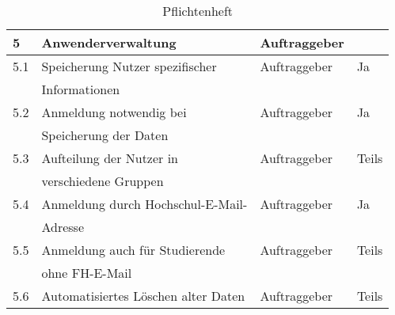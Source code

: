 \begin{table}[H]
\begin{center}
\begin{tabular}{| l | l | l | l |}
\hline    
\rowcolor{LGray} 						
5		& Anwenderverwaltung								& Auftraggeber &\\
\hline
5.1		& Speicherung Nutzer spezifischer 					& Auftraggeber & Ja\\
		& Informationen										&			   &\\
\hline
5.2		& Anmeldung notwendig bei 						 	& Auftraggeber & Ja\\
		& Speicherung der Daten								&			   &\\
\hline
5.3		& Aufteilung der Nutzer in 							& Auftraggeber &Teils\\
		& verschiedene Gruppen								&			   &\\
\hline
5.4		& Anmeldung durch Hochschul-E-Mail-					& Auftraggeber & Ja\\
		& Adresse											&			   &\\
\hline
5.5		& Anmeldung auch für Studierende 					& Auftraggeber & Teils\\
		& ohne FH-E-Mail									& 			   &\\
\hline
5.6		& Automatisiertes Löschen alter Daten				& Auftraggeber & Teils\\
\hline

  \end{tabular}
  \end{center}
\caption[Pflichtenheft]{Pflichtenheft}
\label{tab:lastenheft}
\end{table}

